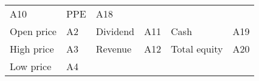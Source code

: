 \documentclass[
  11pt,
]{article}
\begin{document}
\begin{longtable}[]{@{}llllll@{}}
\begin{minipage}[t]{0.09\columnwidth}
A10\strut
\end{minipage} & \begin{minipage}[t]{0.21\columnwidth}\raggedright
PPE\strut
\end{minipage} & \begin{minipage}[t]{0.09\columnwidth}\raggedright
A18\strut
\end{minipage}\tabularnewline
\begin{minipage}[t]{0.16\columnwidth}\raggedright
Open price\strut
\end{minipage} & \begin{minipage}[t]{0.09\columnwidth}\raggedright
A2\strut
\end{minipage} & \begin{minipage}[t]{0.19\columnwidth}\raggedright
Dividend\strut
\end{minipage} & \begin{minipage}[t]{0.09\columnwidth}\raggedright
A11\strut
\end{minipage} & \begin{minipage}[t]{0.21\columnwidth}\raggedright
Cash\strut
\end{minipage} & \begin{minipage}[t]{0.09\columnwidth}\raggedright
A19\strut
\end{minipage}\tabularnewline
\begin{minipage}[t]{0.16\columnwidth}\raggedright
High price\strut
\end{minipage} & \begin{minipage}[t]{0.09\columnwidth}\raggedright
A3\strut
\end{minipage} & \begin{minipage}[t]{0.19\columnwidth}\raggedright
Revenue\strut
\end{minipage} & \begin{minipage}[t]{0.09\columnwidth}\raggedright
A12\strut
\end{minipage} & \begin{minipage}[t]{0.21\columnwidth}\raggedright
Total equity\strut
\end{minipage} & \begin{minipage}[t]{0.09\columnwidth}\raggedright
A20\strut
\end{minipage}\tabularnewline
\begin{minipage}[t]{0.16\columnwidth}\raggedright
Low price\strut
\end{minipage} & \begin{minipage}[t]{0.09\columnwidth}\raggedright
A4\strut
\end{minipage} & \begin{minipage}[t]{0.19\columnwidth}\raggedright

\end{minipage}
\end{longtable}
\end{document}
